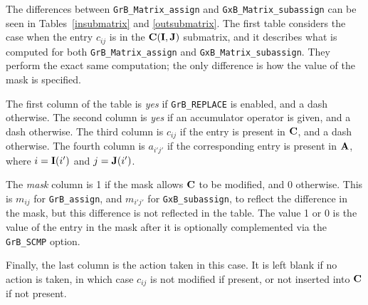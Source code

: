 \documentclass[12pt]{article}
\begin{document}
The differences between \verb'GrB_Matrix_assign' and
\verb'GxB_Matrix_subassign' can be seen in Tables~\ref{insubmatrix} and
\ref{outsubmatrix}.  The first table considers the case when the entry $c_{ij}$
is in the ${\bf C(I,J)}$ submatrix, and it describes what is computed for both
\verb'GrB_Matrix_assign' and \verb'GxB_Matrix_subassign'.  They perform the
exact same computation; the only difference is how the value of the mask is
specified.

The first column of the table is {\em yes} if \verb'GrB_REPLACE' is enabled,
and a dash otherwise.  The second column is {\em yes} if an accumulator
operator is given, and a dash otherwise.  The third column is $c_{ij}$ if the
entry is present in ${\bf C}$, and a dash otherwise.  The fourth column is
$a_{i'j'}$ if the corresponding entry is present in ${\bf A}$, where
$i={\bf I}(i')$ and $j={\bf J}(i')$.

The {\em mask} column is 1 if the mask allows ${\bf C}$ to be modified, and 0
otherwise.  This is $m_{ij}$ for \verb'GrB_assign', and $m_{i'j'}$ for
\verb'GxB_subassign', to reflect the difference in the mask, but this
difference is not reflected in the table.  The value 1 or 0 is the value of the
entry in the mask after it is optionally complemented via the \verb'GrB_SCMP'
option.

Finally, the last column is the action taken in this case.  It is left blank if
no action is taken, in which case $c_{ij}$ is not modified if present, or not
inserted into ${\bf C}$ if not present.
\end{document}

